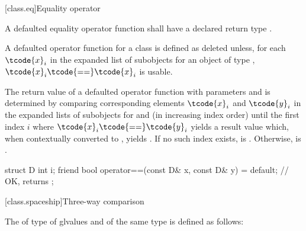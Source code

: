 [class.eq]{Equality operator}
%

\pnum
A defaulted equality operator function
shall have a declared return type .

\pnum
A defaulted \tcode{==} operator function for a class 
is defined as deleted
unless, for each $\tcode{x}_i$ in the expanded list of subobjects
for an object  of type ,
$\tcode{x}_i\tcode{ == }\tcode{x}_i$
is usable.

\pnum
The return value  of a defaulted \tcode{==} operator function
with parameters  and  is determined
by comparing corresponding elements $\tcode{x}_i$ and $\tcode{y}_i$
in the expanded lists of subobjects for  and 
(in increasing index order)
until the first index $i$
where $\tcode{x}_i\tcode{ == }\tcode{y}_i$ yields a result value which,
when contextually converted to , yields .
If no such index exists,  is .
Otherwise,  is .

\pnum
\begin{example}
\begin{codeblock}
struct D {
  int i;
  friend bool operator==(const D& x, const D& y) = default;
                                                // OK, returns 
};
\end{codeblock}
\end{example}

[class.spaceship]{Three-way comparison}
%

\pnum
The 
of type 
of glvalues  and  of the same type
is defined as follows:

